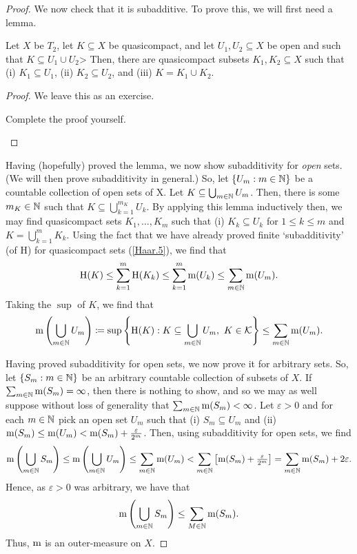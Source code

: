 \begin{thm}
\begin{savenotes}
\begin{proof}
We now check that it is subadditive.  To prove this, we will first need a lemma.
\begin{lma}
Let $X$ be $T_2$, let $K\subseteq X$ be quasicompact, and let $U_1,U_2\subseteq X$ be open and such that $K\subseteq U_1\cup U_2$>  Then, there are quasicompact subsets $K_1,K_2\subseteq X$ such that (i) $K_1\subseteq U_1$, (ii) $K_2\subseteq U_2$, and (iii) $K=K_1\cup K_2$.
\begin{proof}
We leave this as an exercise.
\begin{exr}
Complete the proof yourself.
\end{exr}
\end{proof}
\end{lma}
Having (hopefully) proved the lemma, we now show subadditivity for \emph{open} sets.  (We will then prove subadditivity in general.)  So, let $\{ U_m:m\in \mathbb{N} \}$ be a countable collection of open sets of X.  Let $K\subseteq \bigcup _{m\in \mathbb{N}}U_m$.  Then, there is some $m_K\in \mathbb{N}$ such that $K\subseteq \bigcup _{k=1}^{m_K}U_k$.  By applying this lemma inductively then, we may find quasicompact sets $K_1,\ldots ,K_m$ such that (i) $K_k\subseteq U_k$ for $1\leq k\leq m$ and $K=\bigcup _{k=1}^mK_k$.  Using the fact that we have already proved finite `subadditivity' (of $\mathrm{H}$) for quasicompact sets (\cref{Haar.5}), we find that
\begin{equation}
\mathrm{H}(K)\leq \sum _{k=1}^m\mathrm{H}(K_k)\leq \sum _{k=1}^m\mathrm{m} (U_k)\leq \sum _{m\in \mathbb{N}}\mathrm{m} (U_m).
\end{equation}
Taking the $\sup$ of $K$, we find that
\begin{equation}
\mathrm{m} \left( \bigcup _{m\in \mathbb{N}}U_m\right) \coloneqq \sup \left\{ \mathrm{H}(K):K\subseteq \bigcup _{m\in \mathbb{N}}U_m,\ K\in \mathcal{K}\right\} \leq \sum _{m\in \mathbb{N}}\mathrm{m} (U_m).
\end{equation}

Having proved subadditivity for open sets, we now prove it for arbitrary sets.  So, let $\{ S_m:m\in \mathbb{N} \}$ be an arbitrary countable collection of subsets of $X$.  If $\sum _{m\in \mathbb{N}}\mathrm{m} (S_m)=\infty$, then there is nothing to show, and so we may as well suppose without loss of generality that $\sum _{m\in \mathbb{N}}\mathrm{m} (S_m)<\infty$.  Let $\varepsilon >0$ and for each $m\in \mathbb{N}$ pick an open set $U_m$ such that (i) $S_m\subseteq U_m$ and (ii) $\mathrm{m} (S_m)\leq \mathrm{m} (U_m)<\mathrm{m} (S_m)+\frac{\varepsilon}{2^m}$.  Then, using subadditivity for open sets, we find
\begin{equation}
\mathrm{m} \left( \bigcup _{m\in \mathbb{N}}S_m\right) \leq \mathrm{m} \left( \bigcup _{m\in \mathbb{N}}U_m\right) \leq \sum _{m\in \mathbb{N}}\mathrm{m} (U_m)<\sum _{m\in \mathbb{N}}\left[ \mathrm{m} (S_m)+\tfrac{\varepsilon}{2^m}\right] =\sum _{m\in \mathbb{N}}\mathrm{m} (S_m)+2\varepsilon .
\end{equation}
Hence, as $\varepsilon >0$ was arbitrary, we have that
\begin{equation}
\mathrm{m} \left( \bigcup _{m\in \mathbb{N}}S_m\right) \leq \sum _{M\in \mathbb{N}}\mathrm{m} (S_m).
\end{equation}
Thus, $\mathrm{m}$ is an outer-measure on $X$.


\end{proof}
\end{savenotes}
\end{thm}

